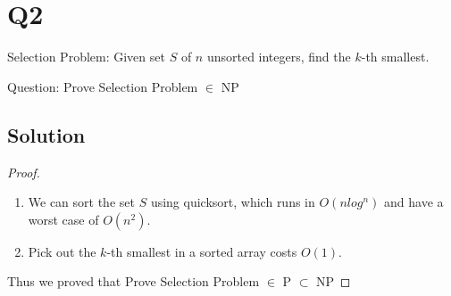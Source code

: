 
\section*{Q2}

Selection Problem: Given set $S$ of $n$ unsorted integers, find the $k$-th smallest.

Question: Prove Selection Problem $\in$ NP

\subsection*{Solution}

\begin{proof}
    \begin{enumerate}
        \item We can sort the set $S$ using quicksort, which runs in $O(n log^n)$ and have a worst case of $O(n^2)$.
        \item Pick out the $k$-th smallest in a sorted array costs $O(1)$.
    \end{enumerate}

    Thus we proved that Prove Selection Problem $\in$ P $\subset$ NP
\end{proof}